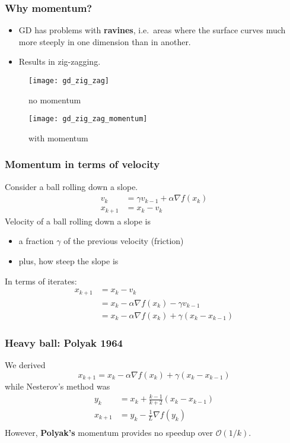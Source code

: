 \documentclass{beamer}
\begin{document}
\begin{frame}
  \frametitle{Why momentum?}
  \begin{itemize}
    \item GD has problems with \textbf{ravines}, i.e.\ areas where the surface curves much more steeply in one dimension than in another.
    \item Results in zig-zagging.
  \end{itemize}

  \begin{minipage}{0.48\textwidth}
    \begin{figure}[ht]
      \centering
      \texttt{[image: gd\_zig\_zag]}
      \caption{no momentum}
    \end{figure}
  \end{minipage}
  \begin{minipage}{0.48\textwidth}
    \begin{figure}[ht]
      \centering
      \texttt{[image: gd\_zig\_zag\_momentum]}
      \caption{with momentum}
    \end{figure}
  \end{minipage}
\end{frame}

\begin{frame}
  \frametitle{Momentum in terms of velocity}
  Consider a ball rolling down a slope.
  \begin{align}
    v_k &= \gamma v_{k-1} + \alpha \nabla f(x_k) \\
    x_{k+1} &= x_k - v_k
  \end{align}
  Velocity of a ball rolling down a slope is
  \begin{itemize}
    \item a fraction $\gamma$ of the previous velocity (friction)
    \item plus, how steep the slope is
  \end{itemize}
  In terms of iterates:
  \begin{align}
    x_{k+1} &= x_k - v_k \\
            &= x_k - \alpha \nabla f(x_k) - \gamma v_{k-1} \\
            &= x_k - \alpha \nabla f(x_k) + \gamma (x_k - x_{k-1})
  \end{align}
\end{frame}


\begin{frame}
  \frametitle{Heavy ball:  Polyak 1964}
  We derived
  \begin{equation}
    x_{k+1} = x_k - \alpha \nabla f(x_k) + \gamma (x_k - x_{k-1})
  \end{equation}
  while Nesterov's method was
  \begin{align}
    y_{k} &= x_k + \frac{k-1}{k+2} (x_k - x_{k-1}) \\
    x_{k+1} &= y_k - \frac{1}{L} \nabla f(y_k) \\
  \end{align}
  However, \textbf{Polyak's} momentum provides no speedup over $\mathcal{O}(1/k)$.
\end{frame}
\end{document}

